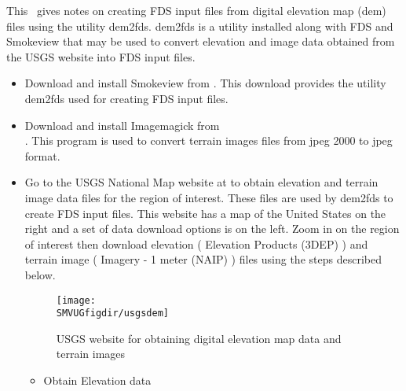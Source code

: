 
This \textchap\ gives notes on creating FDS input files from digital elevation map (dem) files using the utility dem2fds.
dem2fds is a utility installed along with FDS and Smokeview that may be used to convert elevation and image data obtained
from the USGS website  into FDS input files.


\begin{itemize}
\item Download and install Smokeview from .
This download provides the utility dem2fds used for creating FDS input files.

\item Download and install Imagemagick from \\  .
This program is used to convert terrain images files from jpeg 2000 to jpeg format.

\item Go to the USGS National Map website at  to obtain elevation and terrain image data files
for the region of interest.
These files are used by dem2fds to create FDS input files.
This website has a map of the United States on the right and a set of data download options is on the left.
Zoom in on the region of interest then download elevation ( Elevation Products (3DEP) ) and terrain image ( Imagery - 1 meter (NAIP) ) files using the steps described below.

\begin{figure}[bph]
\centerline{
\texttt{[image: \\SMVUGfigdir/usgsdem]}}
 \caption[FDS file overview]{USGS website for obtaining digital elevation map data and terrain images}
\label{usgswebsite}%
\end{figure}

\begin{itemize}
\item Obtain Elevation data


\end{itemize}
\end{itemize}
